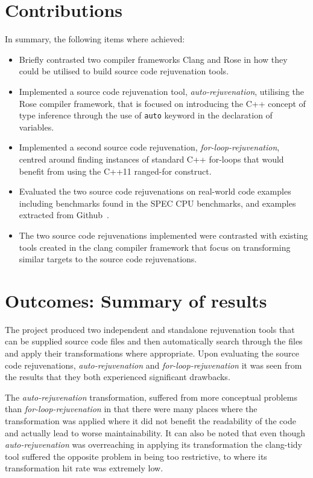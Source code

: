 \documentclass[bsc,frontabs,singlespacing,twoside,parskip,deptreport]{infthesis}
\begin{document}
\section{Contributions}
In summary, the following items where achieved:
\begin{itemize}
    \item Briefly contrasted two compiler frameworks Clang and Rose in how they could be utilised to build source code rejuvenation tools.
    \item Implemented a source code rejuvenation tool, \textit{auto-rejuvenation}, utilising the Rose compiler framework, that is focused on introducing the C++ concept of type inference through the use of \texttt{auto} keyword in the declaration of variables.
    \item Implemented a second source code rejuvenation, \textit{for-loop-rejuvenation}, centred around finding instances of standard  C++ for-loops that would benefit from using the C++11 ranged-for construct. 
    \item Evaluated the two source code rejuvenations on real-world code examples including benchmarks found in the SPEC CPU benchmarks, and examples extracted from Github~\cite{GITHUB}. 
    \item The two source code rejuvenations implemented were contrasted with existing tools created in the clang compiler framework that focus on transforming similar targets to the source code rejuvenations.  
\end{itemize}

\section{Outcomes: Summary of results}

The project produced two independent and standalone rejuvenation tools that can be supplied source code files and then automatically search through the files and apply their transformations where appropriate. Upon evaluating the source code rejuvenations, \textit{auto-rejuvenation} and \textit{for-loop-rejuvenation} it was seen from the results that they both experienced significant drawbacks.

The \textit{auto-rejuvenation} transformation, suffered from more conceptual problems than \textit{for-loop-rejuvenation} in that there were many places where the transformation was applied where it did not benefit the readability of the code and actually lead to worse maintainability. It can also be noted that even though \textit{auto-rejuvenation} was overreaching in applying its transformation the clang-tidy tool suffered the opposite problem in being too restrictive, to where its transformation hit rate was extremely low.  
\end{document}
